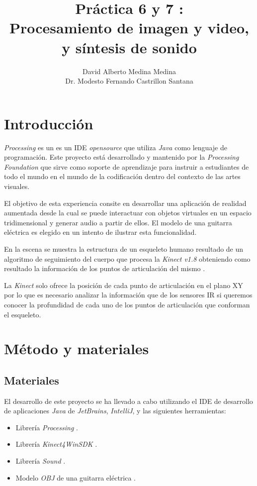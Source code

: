 \documentclass[10pt,a4paper]{report}
\author{David Alberto Medina Medina
	\\
	Dr. Modesto Fernando Castrillon Santana}
\title{Práctica 6 y 7 :\\ Procesamiento de imagen y video, \\y síntesis de sonido}
\begin{document}
	\maketitle
	\tableofcontents
	
	\chapter{Introducción}
	\textit{Processing} es un es un IDE \textit{opensource} que utiliza \textit{Java} como lenguaje de programación. Este proyecto está desarrollado y mantenido por la \textit{Processing Foundation} que sirve como soporte de aprendizaje para instruir a estudiantes de todo el mundo en el mundo de la codificación dentro del contexto de las artes visuales.
	
	El objetivo de esta experiencia consite en desarrollar una aplicación de realidad aumentada desde la cual se puede interactuar con objetos virtuales en un espacio tridimensional y generar audio a partir de ellos. El modelo de una guitarra eléctrica es elegido en un intento de ilustrar esta funcionalidad. 
	
	En la escena se muestra la estructura de un esqueleto humano resultado de un algoritmo de seguimiento del cuerpo que procesa la \textit{Kinect v1.8} obteniendo como resultado la información de los puntos de articulación del mismo \cite{kinect-controller}. 
	
	La \textit{Kinect} solo ofrece la posición de cada punto de articulación en el plano XY por lo que es necesario analizar la información que de los sensores IR si queremos conocer la profundidad de cada uno de los puntos de articulación que conforman el esqueleto.
	
	\chapter{Método y materiales}
	\section{Materiales}
	El desarrollo de este proyecto se ha llevado a cabo utilizando el IDE de desarrollo de aplicaciones \textit{Java} de \textit{JetBrains}, \textit{IntelliJ}, y las siguientes herramientas:
	\begin{itemize}
		\item Librería \textit{Processing} \cite{processing-javadoc}.
		\item Librería \textit{Kinect4WinSDK} \cite{kinect4winsdk}.
		\item Librería \textit{Sound} \cite{sound-library}.
		\item Modelo \textit{OBJ} de una guitarra eléctrica \cite{3d-guitar-model}.
	\end{itemize}
	
\end{document}
